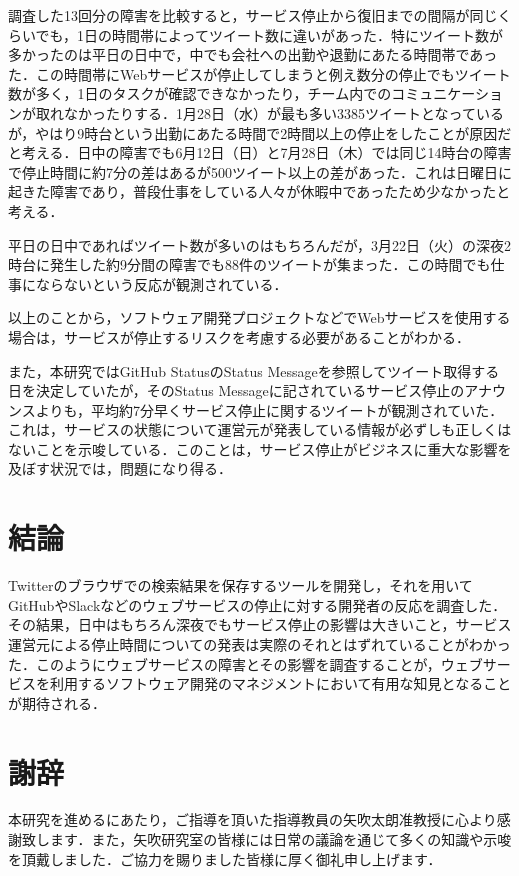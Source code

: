 調査した13回分の障害を比較すると，サービス停止から復旧までの間隔が同じくらいでも，1日の時間帯によってツイート数に違いがあった．特にツイート数が多かったのは平日の日中で，中でも会社への出勤や退勤にあたる時間帯であった．この時間帯にWebサービスが停止してしまうと例え数分の停止でもツイート数が多く，1日のタスクが確認できなかったり，チーム内でのコミュニケーションが取れなかったりする．1月28日（水）が最も多い3385ツイートとなっているが，やはり9時台という出勤にあたる時間で2時間以上の停止をしたことが原因だと考える．日中の障害でも6月12日（日）と7月28日（木）では同じ14時台の障害で停止時間に約7分の差はあるが500ツイート以上の差があった．これは日曜日に起きた障害であり，普段仕事をしている人々が休暇中であったため少なかったと考える．

平日の日中であればツイート数が多いのはもちろんだが，3月22日（火）の深夜2時台に発生した約9分間の障害でも88件のツイートが集まった．この時間でも仕事にならないという反応が観測されている．

以上のことから，ソフトウェア開発プロジェクトなどでWebサービスを使用する場合は，サービスが停止するリスクを考慮する必要があることがわかる．

また，本研究ではGitHub StatusのStatus Messageを参照してツイート取得する日を決定していたが，そのStatus Messageに記されているサービス停止のアナウンスよりも，平均約7分早くサービス停止に関するツイートが観測されていた．これは，サービスの状態について運営元が発表している情報が必ずしも正しくはないことを示唆している．このことは，サービス停止がビジネスに重大な影響を及ぼす状況では，問題になり得る．


\chapter{結論}
Twitterのブラウザでの検索結果を保存するツールを開発し，それを用いてGitHubやSlackなどのウェブサービスの停止に対する開発者の反応を調査した．その結果，日中はもちろん深夜でもサービス停止の影響は大きいこと，サービス運営元による停止時間についての発表は実際のそれとはずれていることがわかった．このようにウェブサービスの障害とその影響を調査することが，ウェブサービスを利用するソフトウェア開発のマネジメントにおいて有用な知見となることが期待される．



\chapter*{謝辞}
本研究を進めるにあたり，ご指導を頂いた指導教員の矢吹太朗准教授に心より感謝致します．また，矢吹研究室の皆様には日常の議論を通じて多くの知識や示唆を頂戴しました．ご協力を賜りました皆様に厚く御礼申し上げます．


